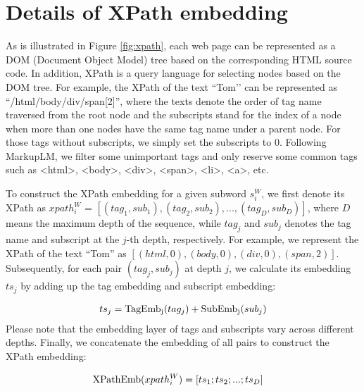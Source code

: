 \documentclass[11pt]{article}
\begin{document}



\appendix

\section{Details of XPath embedding}
\label{sec:xpath}



As is illustrated in Figure \ref{fig:xpath}, each web page can be represented as a DOM (Document Object Model) tree based on the corresponding HTML source code. In addition, XPath is a query language for selecting nodes based on the DOM tree. For example, the XPath of the text ``Tom’’ can be represented as “/html/body/div/span[2]”, where the texts denote the order of tag name traversed from the root node and the subscripts stand for the index of a node when more than one nodes have the same tag name under a parent node. For those tags without subscripts, we simply set the subscripts to 0. Following MarkupLM, we filter some unimportant tags and only reserve some common tags such as <html>, <body>, <div>, <span>, <li>, <a>, etc. 

To construct the XPath embedding for a given subword $s_{i}^{W}$, we first denote its XPath as $xpath_{i}^{W}$ = $[(tag_{1}, sub_{1}), (tag_{2}, sub_{2}), ..., (tag_{D}, sub_{D})]$, where $D$ means the maximum depth of the sequence, while $tag_{j}$ and $sub_{j}$ denotes the tag name and subscript at the $j$-th depth, respectively. For example, we represent the XPath of the text ``Tom'' as $[(html, 0), (body, 0), (div, 0), (span, 2)]$. Subsequently, for each pair $(tag_{j}, sub_{j})$ at depth $j$, we calculate its embedding $ts_{j}$ by adding up the tag embedding and subscript embedding:

\begin{equation}
\begin{aligned}
ts_{j} = {\rm TagEmb_{j}}(tag_{j}) + 
{\rm SubEmb_{j}}(sub_{j})
\end{aligned}
\label{eq:xpath1}
\end{equation}
Please note that the embedding layer of tags and subscripts vary across different depths. Finally, we concatenate the embedding of all pairs to construct the XPath embedding:

\begin{equation}
\begin{aligned}
& {\rm XPathEmb}(xpath_{i}^{W}) = 
[ts_{1}; ts_{2}; ...; ts_{D}]
\end{aligned}
\label{eq:xpath2}
\end{equation}
\end{document}
